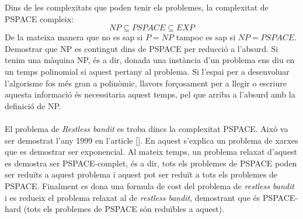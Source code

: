 
	Dins de les complexitats que poden tenir els problemes, la complexitat de PSPACE compleix:
	\[
	{NP} \subseteq PSPACE \subseteq {EXP} %
	\]
	De la mateixa manera que no es sap si $P = NP$ tampoc es sap si $NP = PSPACE$. Demostrar que NP es contingut dins de
	PSPACE per reducció a l'absurd. Si tenim una màquina NP, és a dir, donada una instància d'un problema ens diu en un temps 
	polinomial si aquest pertany al problema. Si l'espai per a desenvoluar l'algorisme fos més gran a polinòmic, llavors forçosament
	per a llegir o escriure aquesta informació és necessitaria aquest temps, pel que arriba a l'absurd amb la definició de NP. %
	\\
	\\
	El problema de \textit{Restless bandit} es troba dincs la complexitat PSPACE. Aixó va ser demostrat l'any 1999 en l'article [].%
	En aquest s'explica un problema de xarxes que es demostrar ser exponencial. Al mateix temps, un problema relaxat d'aquest
	es demostra ser PSPACE-complet, és a dir, tots els problemes de PSPACE poden ser reduïts a aquest problema i aquest pot
	ser reduït a tots els problemes de PSPACE. Finalment es dona una formula de cost del problema de \textit{restless bandit} i
	es redueix el problema relaxat al de \textit{restless bandit}, demostrant que és PSPACE-hard (tots els problemes de PSPACE són
	reduïbles a aquest). %
	\\
